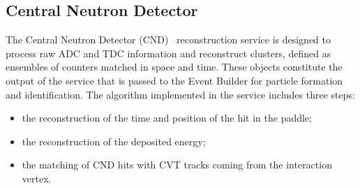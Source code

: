 \subsection{Central Neutron Detector}

The Central Neutron Detector (CND)~\cite{cnd-nim} reconstruction service is designed to process raw ADC
and TDC information and reconstruct clusters, defined as ensembles of counters matched in space and time.
These objects constitute the output of the service that is passed to the Event Builder for particle formation
and identification. The algorithm implemented in the service includes three steps:

\begin{itemize}
\item{the reconstruction of the time and position of the hit in the paddle;}
\item{the reconstruction of the deposited energy;}
\item{the matching of CND hits with CVT tracks coming from the interaction vertex.}
\end{itemize}

%

